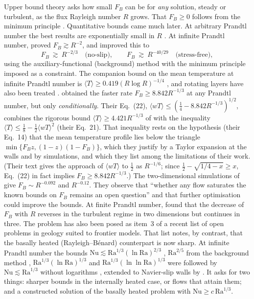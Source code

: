 Upper bound theory asks how small $F_B$ can be for \emph{any} solution, steady or turbulent, as the flux
Rayleigh number $R$ grows. That $F_B\ge0$ follows from the minimum principle \citep{GoluskinSpiegel2012}.
Quantitative bounds came much later. At arbitrary Prandtl number the best results are exponentially small in
$R$ \citep{ArslanEtAl2021,KumarEtAl2022}. At infinite Prandtl number, \citet{ArslanEtAl2023} proved
$F_B\gtrsim R^{-2}$, and \citet{ArslanRojas2025} improved this to
\[
F_B\ \gtrsim\ R^{-2/3}\quad\text{(no-slip)},\qquad F_B\ \gtrsim\ R^{-40/29}\quad\text{(stress-free)},
\]
using the auxiliary-functional (background) method with the minimum principle imposed as a constraint. The
companion bound on the mean temperature at infinite Prandtl number is $\langle T\rangle\ge0.419(R\log R)^{-1/4}$
\citep{WhiteheadDoering2011}, and rotating layers have also been treated \citep{Arslan2024rot,ZhangEtAl2026}.
\citet{ChenEtAl2024} obtained the faster rate $F_B\ge 8.842R^{-1/3}$ at any Prandtl number, but only
\emph{conditionally}. Their Eq.~(22), $\langle wT\rangle\le(\frac14-8.842R^{-1/3})^{1/2}$, combines the rigorous
bound $\langle T\rangle\ge4.421R^{-1/3}$ of \citet{LuDoeringBusse2004} with the inequality
$\langle T\rangle\le\frac18-\frac12\langle wT\rangle^2$ (their Eq.~21). That inequality rests on the hypothesis
(their Eq.~14) that the mean temperature profile lies below the triangle $\min\{F_Bz,(1-z)(1-F_B)\}$, which they
justify by a Taylor expansion at the walls and by simulations, and which they list among the limitations of their
work. (Their text gives the approach of $\langle wT\rangle$ to $\tfrac12$ as $R^{-1/6}$; since
$\tfrac12-\sqrt{1/4-x}\ge x$, Eq.~(22) in fact implies $F_B\ge8.842R^{-1/3}$.) The two-dimensional
simulations of \citet{ArslanRojas2025} give $F_B\sim R^{-0.092}$ and $R^{-0.12}$. They observe that ``whether any flow
saturates the known bounds on $F_B$ remains an open question'' and that further optimisation could improve the
bounds. At finite Prandtl number, \citet{GoluskinvanderPoel2016} found that the decrease of $F_B$ with $R$
reverses in the turbulent regime in two dimensions but continues in three. The problem has also been posed as item~3 of a recent list of open problems in geology suited to
frontier models. That list notes, by contrast, that the basally heated (Rayleigh--B\'enard) counterpart is now
sharp. At infinite Prandtl number the bounds $\mathrm{Nu}\lesssim\mathrm{Ra}^{1/3}(\ln\mathrm{Ra})^{2/3}$
\citep{ConstantinDoering1999}, $\mathrm{Ra}^{2/5}$ from the background method \citep{DoeringConstantin2001},
$\mathrm{Ra}^{1/3}(\ln\mathrm{Ra})^{1/3}$ \citep{DoeringOttoReznikoff2006} and
$\mathrm{Ra}^{1/3}(\ln\ln\mathrm{Ra})^{1/3}$ \citep{OttoSeis2011} were followed by $\mathrm{Nu}\lesssim\mathrm{Ra}^{1/3}$
without logarithms \citep{ChanilloMalchiodi2025}, extended to Navier-slip walls by \citet{Seis2026}. It asks for two things: sharper bounds in the internally heated case, or
flows that attain them; and a constructed solution of the basally heated problem with
$\mathrm{Nu}\ge c\,\mathrm{Ra}^{1/3}$.

